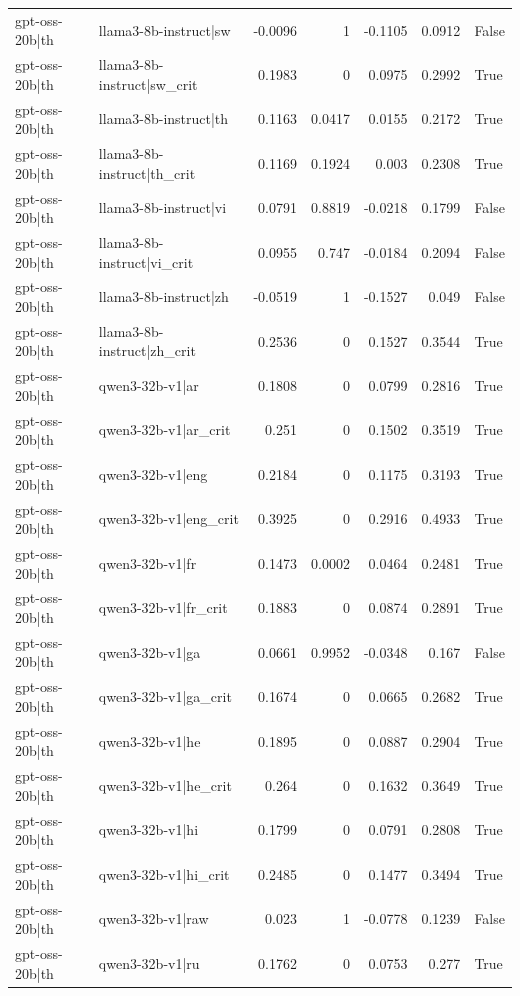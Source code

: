 \begin{table}
\begin{tabular}{l l r r r r l}
gpt-oss-20b|th & llama3-8b-instruct|sw & -0.0096 & 1 & -0.1105 & 0.0912 & False \\
gpt-oss-20b|th & llama3-8b-instruct|sw_crit & 0.1983 & 0 & 0.0975 & 0.2992 & True \\
gpt-oss-20b|th & llama3-8b-instruct|th & 0.1163 & 0.0417 & 0.0155 & 0.2172 & True \\
gpt-oss-20b|th & llama3-8b-instruct|th_crit & 0.1169 & 0.1924 & 0.003 & 0.2308 & True \\
gpt-oss-20b|th & llama3-8b-instruct|vi & 0.0791 & 0.8819 & -0.0218 & 0.1799 & False \\
gpt-oss-20b|th & llama3-8b-instruct|vi_crit & 0.0955 & 0.747 & -0.0184 & 0.2094 & False \\
gpt-oss-20b|th & llama3-8b-instruct|zh & -0.0519 & 1 & -0.1527 & 0.049 & False \\
gpt-oss-20b|th & llama3-8b-instruct|zh_crit & 0.2536 & 0 & 0.1527 & 0.3544 & True \\
gpt-oss-20b|th & qwen3-32b-v1|ar & 0.1808 & 0 & 0.0799 & 0.2816 & True \\
gpt-oss-20b|th & qwen3-32b-v1|ar_crit & 0.251 & 0 & 0.1502 & 0.3519 & True \\
gpt-oss-20b|th & qwen3-32b-v1|eng & 0.2184 & 0 & 0.1175 & 0.3193 & True \\
gpt-oss-20b|th & qwen3-32b-v1|eng_crit & 0.3925 & 0 & 0.2916 & 0.4933 & True \\
gpt-oss-20b|th & qwen3-32b-v1|fr & 0.1473 & 0.0002 & 0.0464 & 0.2481 & True \\
gpt-oss-20b|th & qwen3-32b-v1|fr_crit & 0.1883 & 0 & 0.0874 & 0.2891 & True \\
gpt-oss-20b|th & qwen3-32b-v1|ga & 0.0661 & 0.9952 & -0.0348 & 0.167 & False \\
gpt-oss-20b|th & qwen3-32b-v1|ga_crit & 0.1674 & 0 & 0.0665 & 0.2682 & True \\
gpt-oss-20b|th & qwen3-32b-v1|he & 0.1895 & 0 & 0.0887 & 0.2904 & True \\
gpt-oss-20b|th & qwen3-32b-v1|he_crit & 0.264 & 0 & 0.1632 & 0.3649 & True \\
gpt-oss-20b|th & qwen3-32b-v1|hi & 0.1799 & 0 & 0.0791 & 0.2808 & True \\
gpt-oss-20b|th & qwen3-32b-v1|hi_crit & 0.2485 & 0 & 0.1477 & 0.3494 & True \\
gpt-oss-20b|th & qwen3-32b-v1|raw & 0.023 & 1 & -0.0778 & 0.1239 & False \\
gpt-oss-20b|th & qwen3-32b-v1|ru & 0.1762 & 0 & 0.0753 & 0.277 & True \\

\end{tabular}
\end{table}
